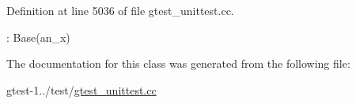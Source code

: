 \-Definition at line 5036 of file gtest\-\_\-unittest.\-cc.


\begin{DoxyCode}
: Base(an_x) {}
\end{DoxyCode}


\-The documentation for this class was generated from the following file\-:\begin{DoxyCompactItemize}
\item 
gtest-\/1../test/\hyperlink{gtest__unittest_8cc}{gtest\-\_\-unittest.\-cc}\end{DoxyCompactItemize}
